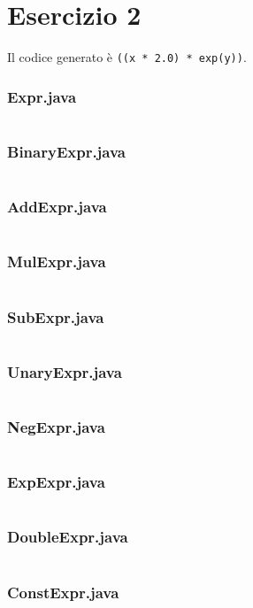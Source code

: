 \section*{Esercizio 2}

Il codice generato è \texttt{((x * 2.0) * exp(y))}.

\subsubsection*{Expr.java}
\inputminted{java}{tex/src/2/Expr.java}

\subsubsection*{BinaryExpr.java}
\inputminted{java}{tex/src/2/BinaryExpr.java}

\subsubsection*{AddExpr.java}
\inputminted{java}{tex/src/2/AddExpr.java}

\subsubsection*{MulExpr.java}
\inputminted{java}{tex/src/2/MulExpr.java}

\subsubsection*{SubExpr.java}
\inputminted{java}{tex/src/2/SubExpr.java}

\subsubsection*{UnaryExpr.java}
\inputminted{java}{tex/src/2/UnaryExpr.java}

\subsubsection*{NegExpr.java}
\inputminted{java}{tex/src/2/NegExpr.java}

\subsubsection*{ExpExpr.java}
\inputminted{java}{tex/src/2/ExpExpr.java}

\subsubsection*{DoubleExpr.java}
\inputminted{java}{tex/src/2/DoubleExpr.java}

\subsubsection*{ConstExpr.java}
\inputminted{java}{tex/src/2/ConstExpr.java}

